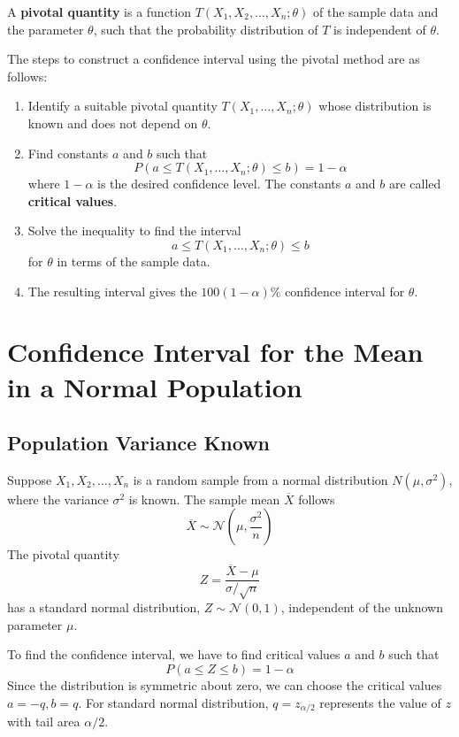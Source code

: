 \documentclass[twoside]{book}
\begin{document}
\begin{textbox}
A \textbf{pivotal quantity} is a function $T(X_1, X_2, \dots, X_n; \theta)$ of the sample data and the parameter $\theta$, such that the probability distribution of $T$ is independent of $\theta$.
\end{textbox}


\medskip

The steps to construct a confidence interval using the pivotal method are as follows:

\begin{enumerate}
    \item Identify a suitable pivotal quantity $T(X_1, \dots, X_n; \theta)$ whose distribution is known and does not depend on $\theta$.
    \item Find constants $a$ and $b$ such that
    \[
    P(a \leq T(X_1, \dots, X_n; \theta) \leq b) = 1 - \alpha
    \]
    where $1-\alpha$ is the desired confidence level. The constants $a$ and $b$ are called \textbf{critical values}.
    \item Solve the inequality to find the interval
    \[
    a \leq T(X_1, \dots, X_n; \theta) \leq b
    \]
    for $\theta$ in terms of the sample data.
    \item The resulting interval gives the $100(1-\alpha)\%$ confidence interval for $\theta$.
\end{enumerate}

\bigskip

\section{Confidence Interval for the Mean in a Normal Population}

\subsection{Population Variance Known}

Suppose $X_1, X_2, \dots, X_n$ is a random sample from a normal distribution $N(\mu, \sigma^2)$, where the variance $\sigma^2$ is known. The sample mean $\overline{X}$ follows
\[
\overline{X} \sim \mathcal{N}\left(\mu, \frac{\sigma^2}{n}\right)
\]
The pivotal quantity
\[
Z = \frac{\overline{X} - \mu}{\sigma / \sqrt{n}}
\]
has a standard normal distribution, $Z \sim \mathcal{N}(0,1)$, independent of the unknown parameter $\mu$.

To find the confidence interval, we have to find critical values $a$ and $b$ such that
$$P\left(a \leq Z \leq b\right) = 1 - \alpha$$
Since the distribution is symmetric about zero, we can choose the critical values $a = -q, b = q$. For standard normal distribution, $q = z_{\alpha/2}$ represents the value of $z$ with tail area $\alpha/2$.
\end{document}
